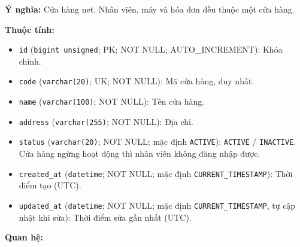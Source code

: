 \textbf{Ý nghĩa:} Cửa hàng net. Nhân viên, máy và hóa đơn đều thuộc một cửa hàng.\par

\textbf{Thuộc tính:}

\begin{itemize}

\item \texttt{id} (\texttt{bigint unsigned}; PK; NOT NULL; AUTO_INCREMENT): Khóa chính.

\item \texttt{code} (\texttt{varchar(20)}; UK; NOT NULL): Mã cửa hàng, duy nhất.

\item \texttt{name} (\texttt{varchar(100)}; NOT NULL): Tên cửa hàng.

\item \texttt{address} (\texttt{varchar(255)}; NOT NULL): Địa chỉ.

\item \texttt{status} (\texttt{varchar(20)}; NOT NULL; mặc định \texttt{ACTIVE}): \texttt{ACTIVE} / \texttt{INACTIVE}. Cửa hàng ngừng hoạt động thì nhân viên không đăng nhập được.

\item \texttt{created\_at} (\texttt{datetime}; NOT NULL; mặc định \texttt{CURRENT\_TIMESTAMP}): Thời điểm tạo (UTC).

\item \texttt{updated\_at} (\texttt{datetime}; NOT NULL; mặc định \texttt{CURRENT\_TIMESTAMP}, tự cập nhật khi sửa): Thời điểm sửa gần nhất (UTC).

\end{itemize}

\textbf{Quan hệ:}

